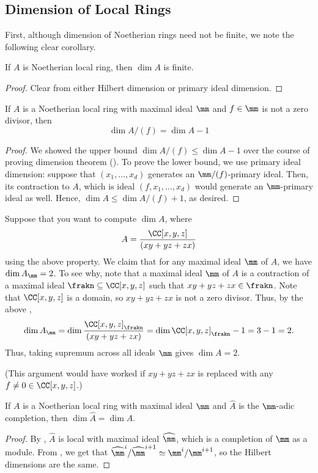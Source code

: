\subsection{Dimension of Local Rings}
First, although dimension of Noetherian rings need not be finite,
we note the following clear corollary.
\begin{corollary}
    If $A$ is Noetherian local ring, then $\dim A$ is finite.
\end{corollary}
\begin{proof}
    Clear from either Hilbert dimension or primary
    ideal dimension.
\end{proof}
\begin{proposition}[Slicing by $f$]
    \label{prop:local_ring_slice}
    If $A$ is a Noetherian local ring with maximal ideal
    $\mm$ and $f\in\mm$
    is not a zero divisor, then 
    $$\dim A/(f) = \dim A - 1$$
\end{proposition}
\begin{proof}
    We showed the upper bound $\dim A/(f) \leq \dim A-1$
    over the course of proving dimension theorem 
    ().
    To prove the lower bound, we use primary ideal dimension:
    suppose that $(x_1,\dots,x_d)$ 
    generates an $\mm/(f)$-primary ideal.
    Then, its contraction to $A$, which is ideal
    $(f,x_1,\dots,x_d)$ would generate an $\mm$-primary ideal as well.
    Hence, $\dim A \leq \dim A/(f) + 1$, as desired.
\end{proof}
\begin{example}
    Suppose that you want to compute $\dim A$, where
    $$A = \frac{\CC[x,y,z]}{(xy+yz+zx)}$$
    using the above property. 
    We claim that for any maximal ideal $\mm$ of $A$,
    we have $\dim A_\mm = 2$. To see why,
    note that a maximal ideal $\mm$ of $A$
    is a contraction of a maximal ideal 
    $\frakn \subseteq \CC[x,y,z]$ such that $xy+yz+zx\in\frakn$.
    Note that $\CC[x,y,z]$ is a domain, so $xy+yz+zx$
    is not a zero divisor. Thus, by the above ,
    $$\dim A_\mm = \dim \frac{\CC[x,y,z]_{\frakn}}{(xy+yz+zx)}
    = \dim \CC[x,y,z]_\frakn - 1 = 3 - 1 = 2.$$
    Thus, taking supremum across all ideals $\mm$
    gives $\dim A = 2$.

    (This argument would have worked if $xy+yz+zx$
    is replaced with any $f\neq 0\in\CC[x,y,z]$.)
\end{example}
\begin{proposition}
    If $A$ is a Noetherian local ring with maximal ideal $\mm$
    and $\widehat A$ is the $\mm$-adic completion,
    then $\dim \widehat  A = \dim A$.
\end{proposition}
\begin{proof}
    By , $\widehat A$
    is local with maximal ideal $\widehat\mm$,
    which is a completion of $\mm$ as a module.
    From ,
    we get that $\widehat \mm^i / \widehat \mm^{i+1}
    \simeq \mm^i / \mm^{i+1}$,
    so the Hilbert dimensions are the same.
\end{proof}
